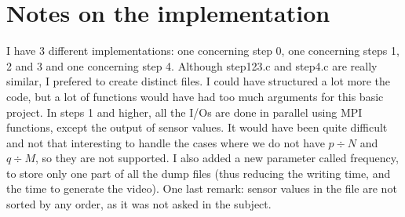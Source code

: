 \documentclass[a4paper,12pt]{article}
\begin{document}
\section{Notes on the implementation}

I have 3 different implementations: one concerning step 0, one concerning steps 1, 2 and 3 and one concerning step 4. Although step123.c and step4.c are really similar, I prefered to create distinct files. I could have structured a lot more the code, but a lot of functions would have had too much arguments for this basic project. In steps 1 and higher, all the I/Os are done in parallel using MPI functions, except the output of sensor values. It would have been quite difficult and not that interesting to handle the cases where we do not have $p \div N$ and $q \div M$, so they are not supported. I also added a new parameter called frequency, to store only one part of all the dump files (thus reducing the writing time, and the time to generate the video). One last remark: sensor values in the file are not sorted by any order, as it was not asked in the subject.
\end{document}
